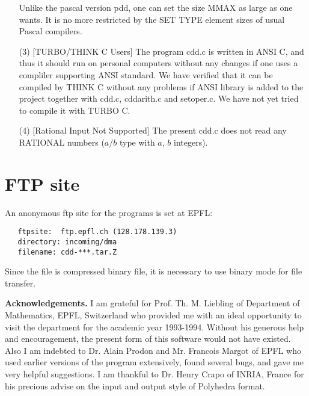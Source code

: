 \begin{itemize}
Unlike the pascal version pdd, one can set the size MMAX as large as one
wants.  It is no more restricted by the SET TYPE element sizes of 
usual Pascal compilers.

\item[(3)] [TURBO/THINK C Users] The program cdd.c is written in
ANSI C, and thus it should run on
personal computers without any changes if one uses a compliler supporting
ANSI standard. We have verified that it can be compiled by THINK C without
any problems if ANSI library is added to the project together with
cdd.c, cddarith.c and setoper.c.  We have not yet tried to compile it with TURBO C.

\item[(4)] [Rational Input Not Supported] The present cdd.c does not
read any RATIONAL numbers ($a/b$ type with $a$, $b$ integers).

\end{itemize}

\section{FTP site}  \label{FTP}
An anonymous ftp site for the programs is set at EPFL:
\begin{verbatim}
   ftpsite:  ftp.epfl.ch (128.178.139.3)
   directory: incoming/dma
   filename: cdd-***.tar.Z
\end{verbatim}
Since the file is compressed binary file, it is necessary to use binary mode for
file transfer.

\bigskip
\noindent
{\large {\bf Acknowledgements.}} 
I am  grateful for Prof. Th. M. Liebling of
Department of Mathematics, EPFL, Switzerland who
provided me with an ideal opportunity to visit the department
for the academic year 1993-1994.  Without his 
generous help and encouragement,
the present form of this software would not have existed.
Also I am indebted to Dr. Alain Prodon and Mr. Francois Margot
of EPFL who used earlier versions of the program extensively,
found several bugs, and  gave me very helpful suggestions.
I am thankful to Dr. Henry Crapo of INRIA, France for
his precious advise on the input and output style of Polyhedra format.

